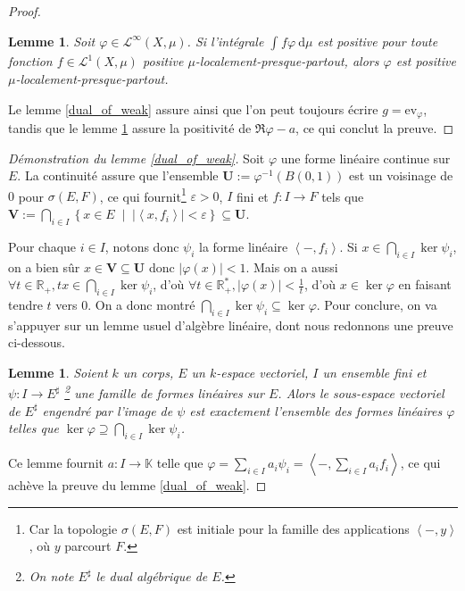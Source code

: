 \documentclass[a4paper,12pt]{article}
\newtheorem{lemma}[theorem]{Lemme}
\newcommand{\R}{\mathbb{R}}
\newcommand{\K}{\mathbb{K}}
\newcommand{\ev}{\mathrm{ev}}
\newcommand{\abs}[1]{\left\vert#1\right\vert}
\newcommand{\ket}[1]{\left\langle #1 \right\rangle}
\newcommand{\set}[1]{\left\{ #1 \right\}}
\newcommand{\integral}[4]{\int_{#1}^{#2} #3~\mathrm{d}#4}
\newcommand{\tq}{\;\middle|\;}
\newcommand{\inv}{^{-1}}
\newcommand{\blank}{{-}}
\begin{document}
\begin{proof}
\begin{lemma}\label{positive_of_positive_form}
    Soit $\varphi\in\mathscr{L}^\infty(X, \mu)$. Si l'intégrale $\integral{}{}{f\varphi}{\mu}$ est positive 
    pour toute fonction $f\in\mathscr{L}^1(X, \mu)$ positive $\mu$-localement-presque-partout, alors $\varphi$ est 
    positive $\mu$-localement-presque-partout.
\end{lemma}

Le lemme \ref{dual_of_weak} assure ainsi que l'on peut toujours écrire $g=\ev_\varphi$,
tandis que le lemme \ref{positive_of_positive_form} assure la positivité de $\Re\varphi - a$, ce qui conclut la preuve.
\end{proof}

\begin{proof}[Démonstration du lemme \ref{dual_of_weak}]
    Soit $\varphi$ une forme linéaire continue sur $E$. La continuité assure que l'ensemble $\mathbf{U} := \varphi\inv(B(0, 1))$ est un voisinage
    de $0$ pour $\sigma(E, F)$, ce qui fournit\footnote{Car la topologie $\sigma(E, F)$ est initiale 
    pour la famille des applications $\ket{\blank, y}$, où $y$ parcourt $F$.} $\varepsilon>0$, $I$ fini et $f : I\to F$ tels que
    $\mathbf{V} := \bigcap_{i\in I} \set{x\in E\tq \abs{\ket{x, f_i}}<\varepsilon}\subseteq\mathbf{U}$. 
    
    Pour chaque $i\in I$, notons donc $\psi_i$ la forme linéaire $\ket{\blank, f_i}$. Si $x\in\bigcap_{i\in I}\ker\psi_i$, on a bien sûr 
    $x\in\mathbf{V}\subseteq\mathbf{U}$ donc $\abs{\varphi(x)}<1$. Mais on a aussi $\forall t\in\R_+, tx\in\bigcap_{i\in I}\ker\psi_i$, d'où 
    $\forall t\in\R_+^*, \abs{\varphi(x)}<\frac1t$, d'où $x\in\ker\varphi$ en faisant tendre $t$ vers $0$. 
    On a donc montré $\bigcap_{i\in I}\ker\psi_i\subseteq\ker\varphi$. Pour conclure, on va s'appuyer sur un lemme usuel d'algèbre linéaire, dont nous redonnons
    une preuve ci-dessous.
    \begin{lemma}\label{span_dual_of_ker}
        Soient $k$ un corps, $E$ un $k$-espace vectoriel, $I$ un ensemble fini et $\psi : I\to E^\sharp$
        \footnote{On note $E^\sharp$ le dual algébrique de $E$.} une famille de formes linéaires sur $E$.
        Alors le sous-espace vectoriel de $E^\sharp$ engendré par l'image de $\psi$ est exactement l'ensemble 
        des formes linéaires $\varphi$ telles que $\ker\varphi\supseteq\bigcap_{i\in I}\ker\psi_i$.
    \end{lemma}

    Ce lemme fournit  $a : I\to\K$ telle que $\varphi = \sum_{i\in I} a_i\psi_i = \ket{\blank, \sum_{i\in I} a_i f_i}$,
    ce qui achève la preuve du lemme \ref{dual_of_weak}.
\end{proof}
\end{document}
